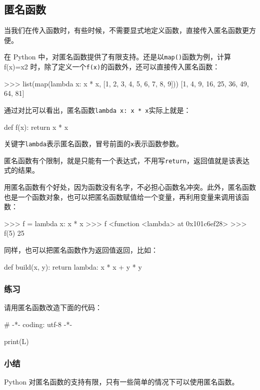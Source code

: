 \hypertarget{ux533fux540dux51fdux6570}{%
\subsection{匿名函数}\label{ux533fux540dux51fdux6570}}

当我们在传入函数时，有些时候，不需要显式地定义函数，直接传入匿名函数更方便。

在 Python
中，对匿名函数提供了有限支持。还是以\texttt{map()}函数为例，计算 f(x)=x2
时，除了定义一个\texttt{f(x)}的函数外，还可以直接传入匿名函数：

\begin{pythoncode}
>>> list(map(lambda x: x * x, [1, 2, 3, 4, 5, 6, 7, 8, 9]))
[1, 4, 9, 16, 25, 36, 49, 64, 81]
\end{pythoncode}

通过对比可以看出，匿名函数\texttt{lambda\ x:\ x\ *\ x}实际上就是：

\begin{pythoncode}
def f(x):
    return x * x
\end{pythoncode}

关键字\texttt{lambda}表示匿名函数，冒号前面的\texttt{x}表示函数参数。

匿名函数有个限制，就是只能有一个表达式，不用写\texttt{return}，返回值就是该表达式的结果。

用匿名函数有个好处，因为函数没有名字，不必担心函数名冲突。此外，匿名函数也是一个函数对象，也可以把匿名函数赋值给一个变量，再利用变量来调用该函数：

\begin{pythoncode}
>>> f = lambda x: x * x
>>> f
<function <lambda> at 0x101c6ef28>
>>> f(5)
25
\end{pythoncode}

同样，也可以把匿名函数作为返回值返回，比如：

\begin{pythoncode}
def build(x, y):
    return lambda: x * x + y * y
\end{pythoncode}

\hypertarget{ux7ec3ux4e60}{%
\subsubsection{练习}\label{ux7ec3ux4e60}}

请用匿名函数改造下面的代码：

\begin{pythoncode}
# -*- coding: utf-8 -*-
\end{pythoncode}

\begin{pythoncode}
print(L)
\end{pythoncode}

\hypertarget{ux5c0fux7ed3}{%
\subsubsection{小结}\label{ux5c0fux7ed3}}

Python 对匿名函数的支持有限，只有一些简单的情况下可以使用匿名函数。

